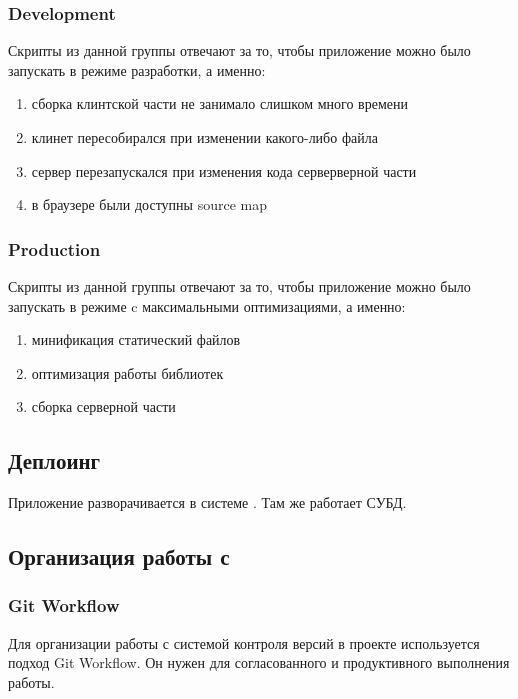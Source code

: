 \subsubsection{Development}
Скрипты из данной группы отвечают за то, чтобы приложение можно было запускать в режиме разработки, а именно:
\begin{enumerate}
    \item сборка клинтской части не занимало слишком много времени
    \item клинет пересобирался при изменении какого-либо файла
    \item сервер перезапускался при изменения кода серверверной части
    \item в браузере были доступны source map
\end{enumerate}

\subsubsection{Production}
Скрипты из данной группы отвечают за то, чтобы приложение можно было запускать в режиме c максимальными оптимизациями, а именно:
\begin{enumerate}
    \item минификация статический файлов
    \item оптимизация работы библиотек
    \item сборка серверной части
\end{enumerate}

\subsection{Деплоинг}
Приложение разворачивается в системе \textcite{heroku}. Там же работает СУБД.

\subsection{Организация работы с \textcite{git}}
\subsubsection{Git Workflow}
Для организации работы с системой контроля версий в проекте используется подход Git Workflow. Он нужен для согласованного и продуктивного выполнения работы.

